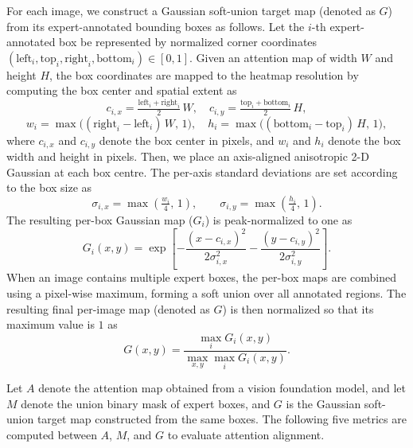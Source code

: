 \documentclass[lineno,pdflatex,sn-mathphys-num]{sn-jnl}%
\theoremstyle{thmstyleone}%
\theoremstyle{thmstyletwo}%
\theoremstyle{thmstylethree}%
\begin{document}
For each image, we construct a Gaussian soft-union target map (denoted as $G$) from its expert-annotated bounding boxes as follows. Let the $i$-th expert-annotated box be represented by normalized corner coordinates $(\mathrm{left}_i, \mathrm{top}_i, \mathrm{right}_i, \mathrm{bottom}_i) \in [0, 1]$. Given an attention map of width $W$ and height $H$, the box coordinates are mapped to the heatmap resolution by computing the box center and spatial extent as
\begin{equation}
c_{i,x} = \tfrac{\mathrm{left}_i + \mathrm{right}_i}{2}\,W,
\quad
c_{i,y} = \tfrac{\mathrm{top}_i + \mathrm{bottom}_i}{2}\,H,
\label{equation centre}
\end{equation}
\begin{equation}
w_i = \max\big((\mathrm{right}_i - \mathrm{left}_i)\,W,\, 1\big),
\quad
h_i = \max\big((\mathrm{bottom}_i - \mathrm{top}_i)\,H,\, 1\big),
\label{equation extent}
\end{equation}
where $c_{i,x}$ and $c_{i,y}$ denote the box center in pixels, and $w_i$ and $h_i$ denote the box width and height in pixels. Then, we place an axis-aligned anisotropic 2-D Gaussian at each
box centre. The per-axis standard deviations are set according to the box size as
\begin{equation}
\sigma_{i,x} = \max\left(\tfrac{w_i}{4},\, 1\right),
\qquad
\sigma_{i,y} = \max\left(\tfrac{h_i}{4},\, 1\right).
\label{equation sigma}
\end{equation}
The resulting per-box Gaussian map ($G_i$) is peak-normalized to one as
\begin{equation}
G_i(x, y) = \exp\left[
-\frac{(x - c_{i,x})^{2}}{2\sigma_{i,x}^{2}}
-\frac{(y - c_{i,y})^{2}}{2\sigma_{i,y}^{2}}
\right].
\label{equation gauss_per_box}
\end{equation}
When an image contains multiple expert boxes, the per-box maps are combined using a pixel-wise maximum, forming a soft union over all annotated regions. The resulting final per-image map (denoted as $G$) is then normalized so that its maximum value is $1$ as
\begin{equation}
G(x, y) = \frac{\max_{i} G_i(x, y)}{\max_{x, y} \max_{i} G_i(x, y)}.
\label{equation gauss_union}
\end{equation}


Let $A$ denote the attention map obtained from a vision foundation model, and let $M$ denote the union binary mask of expert boxes, and $G$ is the Gaussian soft-union target map constructed from the same boxes. The following five metrics are computed between $A$, $M$, and $G$ to evaluate attention alignment.
\end{document}
